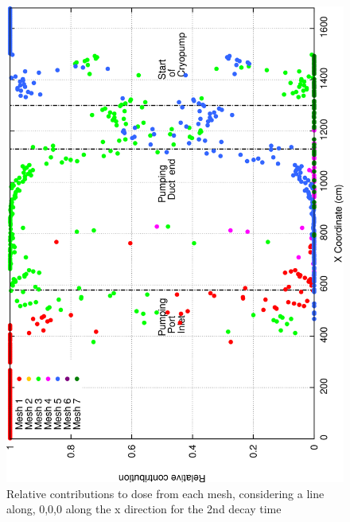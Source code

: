 \documentclass[12pt]{article}
\begin{document}
\begin{figure}[ht!]
\centering
\includegraphics[clip,scale=0.25]{../plots/crosstalk/nob4c/lp/dc2_rel.png}
\caption{Relative contributions to dose from each mesh, considering a line along, 0,0,0 along the x direction for the 2nd decay time}
\label{fig:ct_lp_dc2_rel}
\end{figure}
\end{document}
